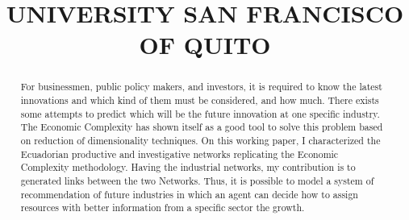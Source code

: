 \documentclass[12pt]{article}
\title{UNIVERSITY SAN FRANCISCO OF QUITO}
\begin{document}
\maketitle
\begin{abstract}

     For businessmen, public policy makers, and investors, it
    is required to know the latest innovations and which
    kind of them must be considered, and how much. There exists some attempts
    to predict which will be the future innovation at one
    specific industry. The Economic Complexity has shown itself
    as a good tool to solve this problem based on reduction of
    dimensionality techniques. On this working paper, 
    I characterized the Ecuadorian productive and investigative
    networks replicating the Economic Complexity
    methodology. Having the industrial networks, my contribution 
    is to generated links between the two Networks. Thus, it is 
    possible to model a system of recommendation of future 
    industries in which an agent can decide how to assign 
    resources with better information from a specific
    sector the growth.
\end{abstract}
\end{document}
